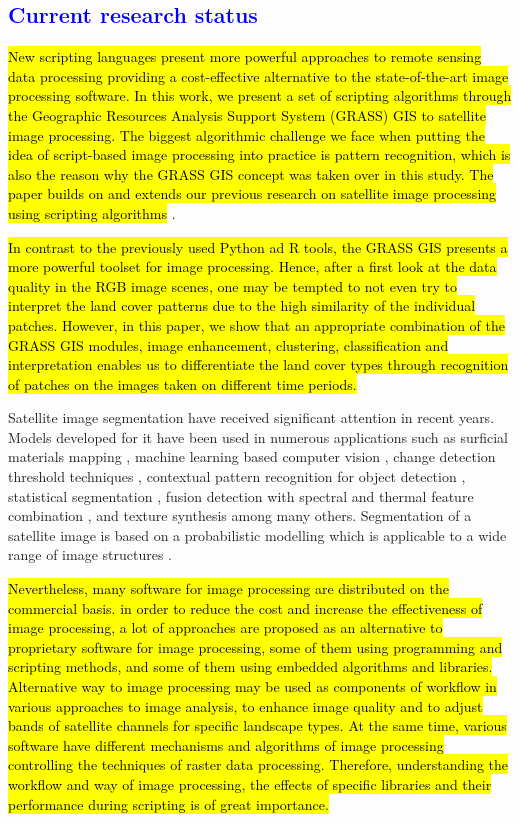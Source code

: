 \documentclass[analytics,article,submit,pdftex,moreauthors]{Definitions/mdpi}
\begin{document}
\subsection{\textcolor{blue}{Current research status}}

\hl{New scripting languages present more powerful approaches to remote sensing data processing providing a cost-effective alternative to the state-of-the-art image processing software. In this work, we present a set of scripting algorithms through the Geographic Resources Analysis Support System (GRASS) GIS to satellite image processing. The biggest algorithmic challenge we face when putting the idea of script-based image processing into practice is pattern recognition, which is also the reason why the GRASS GIS concept was taken over in this study. The paper builds on and extends our previous research on satellite image processing using scripting algorithms} \cite{Lemenkova202227,Lemenkova202310}. 

\hl{In contrast to the previously used Python ad R tools, the GRASS GIS presents a more powerful toolset for image processing. Hence, after a first look at the data quality in the RGB image scenes, one may be tempted to not even try to interpret the land cover patterns due to the high similarity of the individual patches. However, in this paper, we show that an appropriate combination of the GRASS GIS modules, image enhancement, clustering, classification and interpretation enables us to differentiate the land cover types through recognition of patches on the images taken on different time periods. }


Satellite image segmentation have received significant attention in recent years. Models developed for it have been used in numerous applications such as surficial materials mapping \cite{6947039}, machine learning based computer vision \cite{8914551}, change detection threshold techniques \cite{6005084}, contextual pattern recognition for object detection \cite{10006917,9719051,4284070}, statistical segmentation \cite{7730056,7877513}, fusion detection with spectral and thermal feature combination \cite{7730710}, and texture synthesis \cite{576322} among many others.
Segmentation of a satellite image is based on a probabilistic modelling which is applicable to a wide range of image structures \cite{Buscombe}. 

\hl{Nevertheless, many software for image processing are distributed on the commercial basis. in order to reduce the cost and increase the effectiveness of image processing, a lot of approaches are proposed as an alternative to proprietary software for image processing, some of them using programming and scripting methods, and some of them using embedded algorithms and libraries. Alternative way to image processing may be used as components of workflow in various approaches to image analysis, to enhance image quality and to adjust bands of satellite channels for specific landscape types. At the same time, various software have different mechanisms and algorithms of image processing controlling the techniques of raster data processing. Therefore, understanding the workflow and way of image processing, the effects of specific libraries and their performance during scripting is of great importance.}
\end{document}
